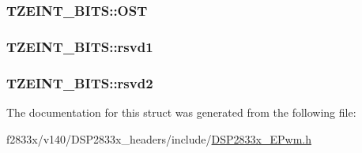 \subsubsection[{O\+S\+T}]{ T\+Z\+E\+I\+N\+T\+\_\+\+B\+I\+T\+S\+::\+O\+S\+T}\label{struct_t_z_e_i_n_t___b_i_t_s_a4926cd6f43fbb51292731e428cd5aedd}
\hypertarget{struct_t_z_e_i_n_t___b_i_t_s_a8b7d089e227e96416125b290bf8c577e}{}
\subsubsection[{rsvd1}]{ T\+Z\+E\+I\+N\+T\+\_\+\+B\+I\+T\+S\+::rsvd1}\label{struct_t_z_e_i_n_t___b_i_t_s_a8b7d089e227e96416125b290bf8c577e}
\hypertarget{struct_t_z_e_i_n_t___b_i_t_s_aedb9d3ba82619c40020d9972536fbb2d}{}
\subsubsection[{rsvd2}]{ T\+Z\+E\+I\+N\+T\+\_\+\+B\+I\+T\+S\+::rsvd2}\label{struct_t_z_e_i_n_t___b_i_t_s_aedb9d3ba82619c40020d9972536fbb2d}


The documentation for this struct was generated from the following file\+:\begin{DoxyCompactItemize}
\item 
f2833x/v140/\+D\+S\+P2833x\+\_\+headers/include/\hyperlink{_d_s_p2833x___e_pwm_8h}{D\+S\+P2833x\+\_\+\+E\+Pwm.\+h}\end{DoxyCompactItemize}
